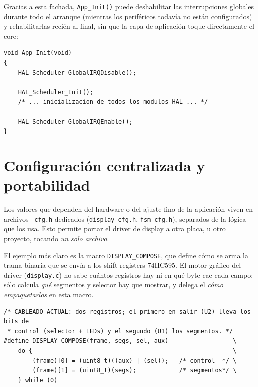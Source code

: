 \documentclass[11pt,a4paper]{article}
\begin{document}
Gracias a esta fachada, \lstinline{App_Init()} puede deshabilitar las
interrupciones globales durante todo el arranque (mientras los periféricos
todavía no están configurados) y rehabilitarlas recién al final, sin que la
capa de aplicación toque directamente el core:

\begin{lstlisting}[caption={Arranque seguro en \texttt{App\_Init()}: interrupciones cortadas mientras el hardware se configura.}, label={lst:appinit}]
void App_Init(void)
{
    HAL_Scheduler_GlobalIRQDisable();

    HAL_Scheduler_Init();
    /* ... inicializacion de todos los modulos HAL ... */

    HAL_Scheduler_GlobalIRQEnable();
}
\end{lstlisting}


\section{Configuración centralizada y portabilidad}

Los valores que dependen del hardware o del ajuste fino de la aplicación
viven en archivos \lstinline{_cfg.h} dedicados (\lstinline{display_cfg.h},
\lstinline{fsm_cfg.h}), separados de la lógica que los usa. Esto permite
portar el driver de display a otra placa, u otro proyecto, tocando
\emph{un solo archivo}.

El ejemplo más claro es la macro \lstinline{DISPLAY_COMPOSE}, que define
cómo se arma la trama binaria que se envía a los shift-registers 74HC595.
El motor gráfico del driver (\lstinline{display.c}) no sabe cuántos
registros hay ni en qué byte cae cada campo: sólo calcula \emph{qué}
segmentos y selector hay que mostrar, y delega el \emph{cómo empaquetarlos}
en esta macro.

\begin{lstlisting}[caption={\texttt{DISPLAY\_COMPOSE} en \texttt{display\_cfg.h}: el único lugar que conoce el cableado real de los shift-registers.}, label={lst:compose}]
/* CABLEADO ACTUAL: dos registros; el primero en salir (U2) lleva los bits de
 * control (selector + LEDs) y el segundo (U1) los segmentos. */
#define DISPLAY_COMPOSE(frame, segs, sel, aux)                  \
    do {                                                        \
        (frame)[0] = (uint8_t)((aux) | (sel));   /* control  */ \
        (frame)[1] = (uint8_t)(segs);            /* segmentos*/ \
    } while (0)
\end{lstlisting}
\end{document}
